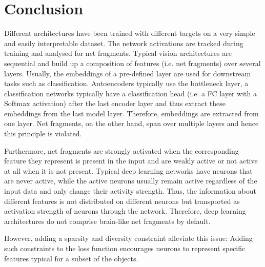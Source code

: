 \section{Conclusion}
Different architectures have been trained with different targets on a very simple and easily interpretable dataset.
The network activations are tracked during training and analysed for net fragments.
Typical vision architectures are sequential and build up a composition of features (i.e. net fragments) over several layers.
Usually, the embeddings of a pre-defined layer are used for downstream tasks such as classification.
Autoencoders typically use the bottleneck layer, a classification networks typically have a classification head (i.e. a FC layer with a Softmax activation) after the last encoder layer and thus extract these embeddings from the last model layer.
Therefore, embeddings are extracted from one layer.
Net fragments, on the other hand, span over multiple layers and hence this principle is violated.

Furthermore, net fragments are strongly activated when the corresponding feature they represent is present in the input and are weakly active or not active at all when it is not present.
Typical deep learning networks have neurons that are never active, while the active neurons usually remain active regardless of the input data and only change their activity strength.
Thus, the information about different features is not distributed on different neurons but transported as activation strength of neurons through the network.
Therefore, deep learning architectures do not comprise brain-like net fragments by default.

However, adding a sparsity and diversity constraint alleviate this issue:
Adding such constraints to the loss function encourages neurons to represent specific features typical for a subset of the objects.

